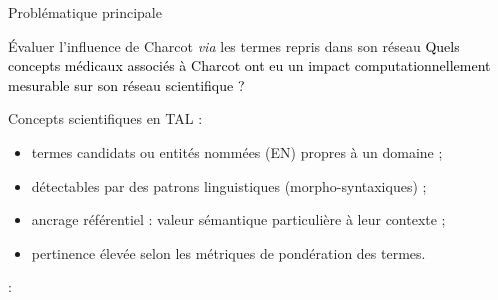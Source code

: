 \begin{frame}{Problématique principale}

	\begin{block}{Évaluer l’influence de Charcot \textit{via} les termes repris dans son réseau}
					\centering
					\textcolor{black}{Quels concepts médicaux associés à Charcot ont eu un impact computationnellement mesurable sur son réseau scientifique ?}
				\end{block}

\bigskip
Concepts scientifiques en \textsc{TAL} :
\begin{itemize}
	\item termes candidats ou entités nommées (\textsc{EN}) propres à un domaine ;
	\item détectables par des patrons linguistiques (morpho-syntaxiques) ;
	\item ancrage référentiel : valeur sémantique particulière à leur contexte ;
	\item pertinence élevée selon les métriques de pondération des termes.
\end{itemize}		
\begin{flushright}
\small
\citep[pp.~1-2]{omrane2011poids}: 
\end{flushright}		
				
\end{frame}
